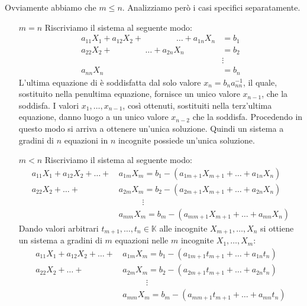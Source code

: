 \documentclass{article}
\theoremstyle{plain}
\theoremstyle{definition}
\theoremstyle{remark}
\begin{document}
Ovviamente abbiamo che \( m \leq n \).
Analizziamo però i casi specifici separatamente.
\begin{itemize}
    \item[\( m = n \)] 
    Riscriviamo il sistema al seguente modo:
    \[
    \begin{aligned}
        a_{11}X_1 + a_{12}X_2 + \quad\quad\quad\quad\ldots + a_{1n}X_n &= b_1 \\
        a_{22}X_2 + \quad\quad\quad\quad\ldots + a_{2n}X_n &= b_2 \\
        &\vdots \\
        a_{nn}X_n &= b_n
    \end{aligned}
    \]
    L'ultima equazione di è soddisfatta dal solo valore \( x_n = b_na_{nn}^{-1} \), il quale, sostituito nella penultima equazione, fornisce un unico valore \( x_{n-1} \), che la soddisfa. 
    I valori \( x_1, \ldots, x_{n-1} \), così ottenuti, sostituiti nella terz'ultima equazione, danno luogo a un unico valore \( x_{n-2} \) che la soddisfa. 
    Procedendo in questo modo si arriva a ottenere un'unica soluzione.
    Quindi un sistema a gradini di \( n \) equazioni in \( n \) incognite possiede un'unica soluzione.
    \item[\( m < n \)] 
    Riscriviamo il sistema al seguente modo:
    \[
    \begin{aligned}
        a_{11}X_1+a_{12}X_2+\dots+&\,a_{1m}X_m=b_1-(a_{1m+1}X_{m+1}+\dots+a_{1n}X_n)\\
                  a_{22}X_2+\dots+&\,a_{2m}X_m=b_2-(a_{2m+1}X_{m+1}+\dots+a_{2n}X_n)\\
                  &\quad\quad\quad\vdots\\
                  &\,a_{mm}X_m=b_m-(a_{mm+1}X_{m+1}+\dots+a_{mn}X_n)
    \end{aligned}
    \]
    Dando valori arbitrari \( t_{m+1}, \ldots, t_n\in\mathbb{K} \) alle incognite \( X_{m+1}, \ldots, X_n \) si ottiene un sistema a gradini di \( m \) equazioni nelle \( m \) incognite \( X_1, \ldots, X_m \):
    \begin{equation}
        \begin{aligned}
            a_{11}X_1+a_{12}X_2+\dots+&\,a_{1m}X_m=b_1-(a_{1m+1}t_{m+1}+\dots+a_{1n}t_n)\\
                      a_{22}X_2+\dots+&\,a_{2m}X_m=b_2-(a_{2m+1}t_{m+1}+\dots+a_{2n}t_n)\\
                      &\quad\quad\quad\vdots\\
                      &\,a_{mm}X_m=b_m-(a_{mm+1}t_{m+1}+\dots+a_{mn}t_n)

\end{aligned}
\end{equation}
\end{itemize}
\end{document}
